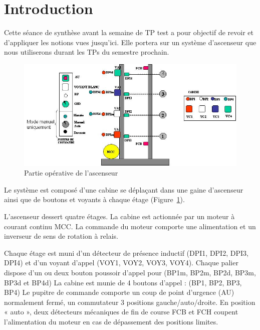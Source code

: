 \documentclass[11pt]{article}
\begin{document}
\UPSTIbuildPage




\section{Introduction}
Cette séance de synthèse avant la semaine de TP test a pour objectif de revoir et d'appliquer les notions vues jusqu'ici. Elle portera sur un système d'ascenseur que nous utiliserons durant les TPs du semestre prochain. 

\begin{figure}[ht]
	\centering
	\includegraphics[width=.85\linewidth]{images/ascenseur.jpg}
	\caption{Partie opérative de l'ascenseur}
	\label{fig:schemaPartieOperative}
\end{figure}

Le système est composé d'une cabine se déplaçant dans une gaine d'ascenseur ainsi que de boutons et voyants à chaque étage (Figure~\ref{fig:schemaPartieOperative}).

L’ascenseur dessert quatre étages. La cabine est actionnée par un moteur à courant continu MCC.
La commande du moteur comporte une alimentation et un inverseur de sens de rotation à relais.

Chaque étage est muni d’un détecteur de présence inductif (DPI1, DPI2, DPI3, DPI4) et d’un
voyant d’appel (VOY1, VOY2, VOY3, VOY4).
Chaque palier dispose d'un ou deux bouton poussoir d’appel pour (BP1m, BP2m, BP2d, BP3m, BP3d et BP4d)
La cabine est munie de 4 boutons d’appel : (BP1, BP2, BP3, BP4)
Le pupitre de commande comporte un coup de point d’urgence (AU) normalement fermé, un commutateur 3 positions
gauche/auto/droite. En position « auto », deux détecteurs mécaniques de fin de course FCB et
FCH coupent l’alimentation du moteur en cas de dépassement des positions limites. 
\end{document}

